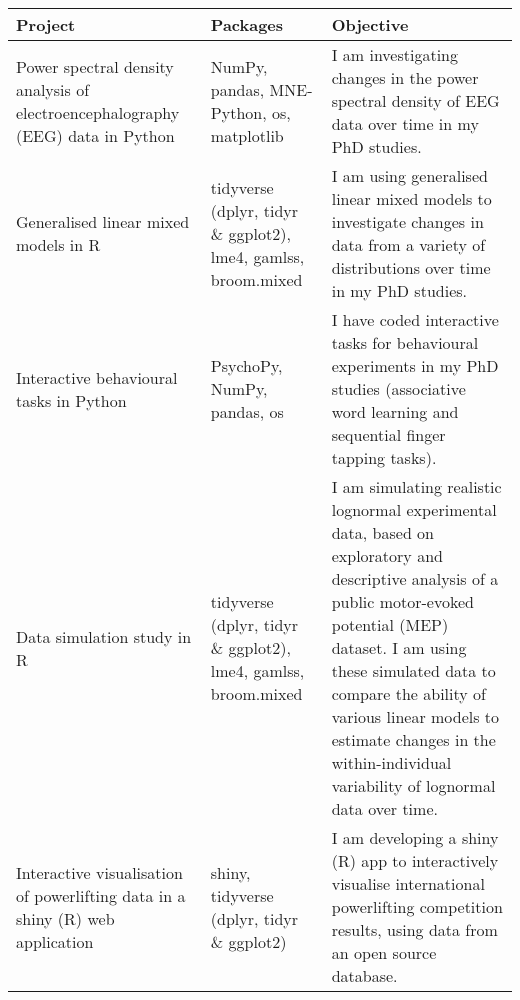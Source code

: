\begin{table}[!h]
	\centering\begingroup\fontsize{12}{12}\selectfont
	
	\begin{tabular}{>{\raggedright\arraybackslash}p{5.5cm}>{\raggedright\arraybackslash}p{3.3cm}>{\raggedright\arraybackslash}p{9cm}}
	
	\textbf{Project} & \textbf{Packages} & \textbf{Objective}\\
	\midrule
	Power spectral density analysis of electroencephalography (EEG) data in Python & NumPy, pandas, MNE-Python, os, matplotlib & I am investigating changes in the power spectral density of EEG data over time in my PhD studies.\\
	\addlinespace
	Generalised linear mixed models in R & tidyverse (dplyr, tidyr \& ggplot2), lme4, gamlss, broom.mixed & I am using generalised linear mixed models to investigate changes in data from a variety of distributions over time in my PhD studies.\\
	\addlinespace
	Interactive behavioural tasks in Python & PsychoPy, NumPy, pandas, os & I have coded interactive tasks for behavioural experiments in my PhD studies (associative word learning and sequential finger tapping tasks).\\
	\addlinespace
	Data simulation study in R & tidyverse (dplyr, tidyr \& ggplot2), lme4, gamlss, broom.mixed & I am simulating realistic lognormal experimental data, based on exploratory and descriptive analysis of a public motor-evoked potential (MEP) dataset. I am using these simulated data to compare the ability of various linear models to estimate changes in the within-individual variability of lognormal data over time.\\
	\addlinespace
	Interactive visualisation of powerlifting data in a shiny (R) web application & shiny, tidyverse (dplyr, tidyr \& ggplot2) & I am developing a shiny (R) app to interactively visualise international powerlifting competition results, using data from an open source database.\\
	
	\end{tabular}
	\endgroup{}
\end{table}